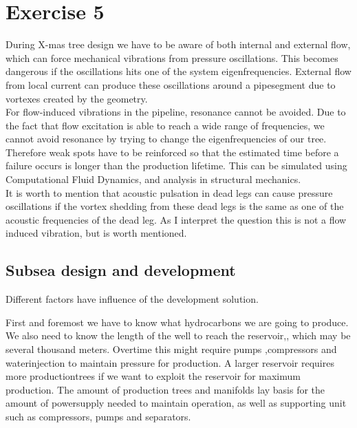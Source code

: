 \documentclass[a4paper,norsk]{article}
\begin{document}
\newpage
\section*{Exercise 5}
During X-mas tree design we have to be aware of both internal and external flow, which can force mechanical vibrations from pressure oscillations. This becomes dangerous if the oscillations hits one of the system eigenfrequencies. External flow from local current can produce these oscillations around a pipesegment due to vortexes created by the geometry. \\
For flow-induced vibrations in the pipeline, resonance cannot be avoided. Due to the fact that flow excitation is able to reach a wide range of frequencies, we cannot avoid resonance by trying to change the eigenfrequencies of our tree. Therefore weak spots have to be reinforced so that the estimated time before a failure occurs is longer than the production lifetime. This can be simulated using Computational Fluid Dynamics, and analysis in structural mechanics. \\
It is worth to mention that acoustic pulsation in dead legs can cause pressure oscillations if the vortex shedding from these dead legs is the same as one of the acoustic frequencies of the dead leg. As I interpret the question this is not a flow induced vibration, but is worth mentioned.

\subsection*{Subsea design and development}
Different factors have influence of the development solution. 

First and foremost we have to know what hydrocarbons we are going to produce. We also need to know the length of the well to reach the reservoir,, which may be several thousand meters. Overtime this might require pumps ,compressors and waterinjection to maintain pressure for production. 
A larger reservoir requires more productiontrees if we want to exploit the reservoir for maximum production. 
The amount of production trees and manifolds lay basis for the amount of powersupply needed to maintain operation, as well as supporting unit such as compressors, pumps and separators. \\
\end{document}
